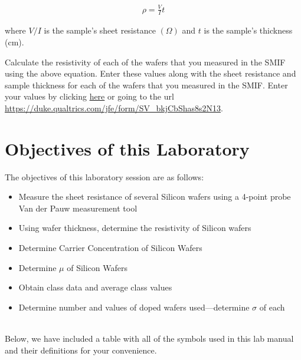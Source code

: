 \documentclass[12pt]{../manual}
\begin{document}
\begin{align}
\rho = \frac{V}{I} t
\end{align}

where $V/I$ is the sample's sheet resistance $(\Omega)$ and $t$ is the sample's thickness (cm).

Calculate the resistivity of each of the wafers that you measured in the SMIF using the above equation.  Enter these values along with the sheet resistance and sample thickness for each of the wafers that you measured in the SMIF.  Enter your values by clicking \href{https://duke.qualtrics.com/jfe/form/SV_bkjCbShas8s2N13}{here} or going to the url \url{https://duke.qualtrics.com/jfe/form/SV_bkjCbShas8s2N13}.

\newpage
\section{Objectives of this Laboratory}
The objectives of this laboratory session are as follows:
\begin{itemize}
\item Measure the sheet resistance of several Silicon wafers using a 4-point probe Van der Pauw measurement tool
\item Using wafer thickness, determine the resistivity of Silicon wafers
\item Determine Carrier Concentration of Silicon Wafers
\item Determine $\mu$ of Silicon Wafers
\item Obtain class data and average class values
\item Determine number and values of doped wafers used---determine $\sigma$ of each
\end{itemize}
~\\ Below, we have included a table with all of the symbols used in this lab manual and their definitions for your convenience.
\def\arraystretch{1.5}
\end{document}
